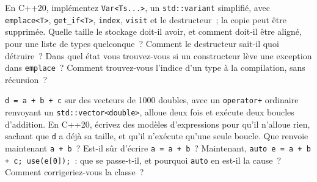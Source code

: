 \begin{question}\label{iq:iv3:cpp:59}
En C++20, implémentez \texttt{Var<Ts.{}.{}.>}, un \texttt{std::variant} simplifié, avec \texttt{emplace<T>}, \texttt{get\_if<T>}, \texttt{index}, \texttt{visit} et le destructeur~; la copie peut être supprimée. Quelle taille le stockage doit-il avoir, et comment doit-il être aligné, pour une liste de types quelconque~? Comment le destructeur sait-il quoi détruire~? Dans quel état vous trouvez-vous si un constructeur lève une exception dans \texttt{emplace}~? Comment trouvez-vous l'indice d'un type à la compilation, sans récursion~?
\end{question}

\begin{question}\label{iq:iv3:cpp:60}
\texttt{d = a + b + c} sur des vecteurs de 1000 doubles, avec un \texttt{operator+} ordinaire renvoyant un \texttt{std::vector<double>}, alloue deux fois et exécute deux boucles d'addition. En C++20, écrivez des modèles d'expressions pour qu'il n'alloue rien, sachant que \texttt{d} a déjà sa taille, et qu'il n'exécute qu'une seule boucle. Que renvoie maintenant \texttt{a + b}~? Est-il sûr d'écrire \texttt{a = a + b}~? Maintenant, \texttt{auto e = a + b + c; use(e[0]);}~: que se passe-t-il, et pourquoi \texttt{auto} en est-il la cause~? Comment corrigeriez-vous la classe~?
\end{question}
